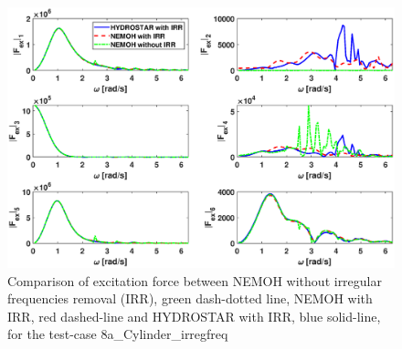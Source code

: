 \documentclass[12pt,a4paper,titlepage]{article}
\begin{document}
\begin{figure}[ht!]
\centering

\includegraphics[scale=0.5,trim = 10mm 0mm 30mm 0mm, clip]{figures/Cylinder/excForce.eps}

\caption{Comparison of excitation force between NEMOH without irregular frequencies removal (IRR), green dash-dotted line, NEMOH with IRR, red dashed-line and HYDROSTAR with IRR, blue solid-line, for the test-case 8a\_Cylinder\_irregfreq}\label{fig:Cylinder_IRR_excforce}
\end{figure}
\end{document}

